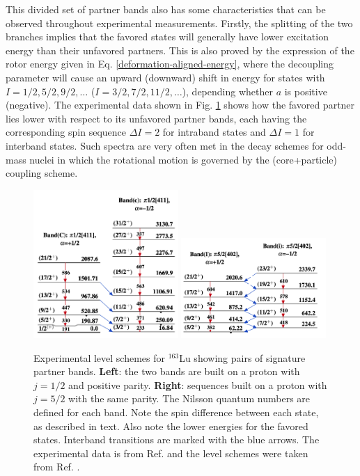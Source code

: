 This divided set of partner bands also has some characteristics that can be observed throughout experimental measurements. Firstly, the splitting of the two branches implies that the favored states will generally have lower excitation energy than their unfavored partners. This is also proved by the expression of the rotor energy given in Eq. \ref{deformation-aligned-energy}, where the decoupling parameter will cause an upward (downward) shift in energy for states with $I=1/2,5/2,9/2,\dots$ ($I=3/2,7/2,11/2,\dots$), depending whether $a$ is positive (negative). The experimental data shown in Fig. \ref{level-scheme-signature-splitting} shows how the favored partner lies lower with respect to its unfavored partner bands, each having the corresponding spin sequence $\Delta I=2$ for intraband states and $\Delta I=1$ for interband states. Such spectra are very often met in the decay schemes for odd-mass nuclei in which the rotational motion is governed by the (core+particle) coupling scheme.
\begin{figure}
    \centering
    \includegraphics[width=0.49\textwidth]{Chapters/Figures/Lu_163_K12-band.png}
    \includegraphics[width=0.49\textwidth]{Chapters/Figures/Lu_163_signatureSplitting.png}
    \caption{Experimental level schemes for $^{163}$Lu showing pairs of signature partner bands. \textbf{Left}: the two bands are built on a proton with $j=1/2$ and positive parity. \textbf{Right}: sequences built on a proton with $j=5/2$ with the same parity. The Nilsson quantum numbers are defined for each band. Note the spin difference between each state, as described in text. Also note the lower energies for the favored states. Interband transitions are marked with the blue arrows. The experimental data is from Ref. \cite{reich2010nuclear} and the level schemes were taken from Ref. \cite{bhat1992evaluated}.}
    \label{level-scheme-signature-splitting}
\end{figure}

